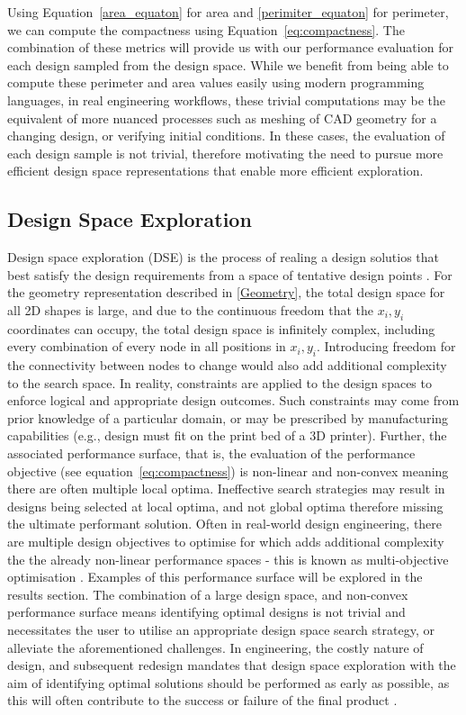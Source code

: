\documentclass{article}
\begin{document}
Using Equation~\ref{area_equaton} for area and \ref{perimiter_equaton} for perimeter, we can compute the compactness using Equation~\ref{eq:compactness}. The combination of these metrics will provide us with our performance evaluation for each design sampled from the design space. While we benefit from being able to compute these perimeter and area values easily using modern programming languages, in real engineering workflows, these trivial computations may be the equivalent of more nuanced processes such as meshing of CAD geometry for a changing design, or verifying initial conditions. In these cases, the evaluation of each design sample is not trivial, therefore motivating the need to pursue more efficient design space representations that enable more efficient exploration.

\subsection{Design Space Exploration}
Design space exploration (DSE) is the process of realing a design solutios  that best satisfy the design requirements from a space of tentative design points \citep{CARDOSO2017255}. For the geometry representation described in \ref{Geometry}, the total design space for all 2D shapes is large, and due to the continuous freedom that the $x_i,y_i$ coordinates can occupy, the total design space is infinitely complex, including every combination of every node in all positions in $x_i,y_i$. Introducing freedom for the connectivity between nodes to change would also add additional complexity to the search space. In reality, constraints are applied to the design spaces to enforce logical and appropriate design outcomes. Such constraints may come from prior knowledge of a particular domain, or may be prescribed by manufacturing capabilities (e.g., design must fit on the print bed of a 3D printer). Further, the associated performance surface, that is, the evaluation of the performance objective (see equation~\ref{eq:compactness}) is non-linear and non-convex meaning there are often multiple local optima. Ineffective search strategies may result in designs being selected at local optima, and not global optima therefore missing the ultimate performant solution.
Often in real-world design engineering, there are multiple design objectives to optimise for which adds additional complexity the the already non-linear performance spaces - this is known as multi-objective optimisation \citep{Pimentel2022}.  Examples of this performance surface will be explored in the results section. The combination of a large design space, and non-convex performance surface means identifying optimal designs is not trivial and necessitates the user to utilise an appropriate design space search strategy, or alleviate the aforementioned challenges. In engineering, the costly nature of design, and subsequent redesign mandates that design space exploration with the aim of identifying optimal solutions should be performed as early as possible, as this will often contribute to the success or failure of the final product \citep{Pimentel2022}. 
\end{document}

